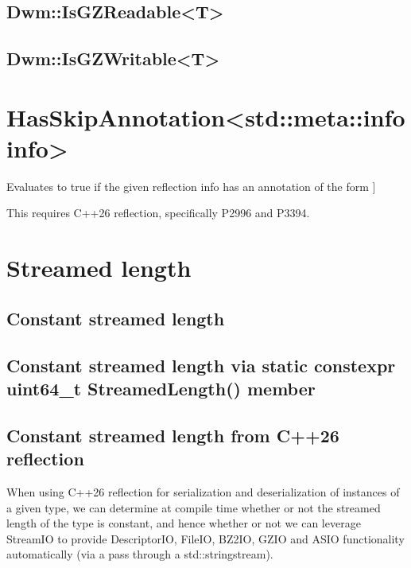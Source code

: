\begin{minipage}{\textwidth}
\subsection{\ttfamily Dwm::IsGZReadable<T>}\label{concept:DwmIsGZReadable}

\subsection{\ttfamily Dwm::IsGZWritable<T>}\label{concept:DwmIsGZWritable}
\end{minipage}

\section{\ttfamily HasSkipAnnotation<std::meta::info info>}
Evaluates to true if the given reflection {\ttfamily info} has an
annotation of the form {\ttfamily [[=Dwm::skip\_io]]}

This requires C++26 reflection, specifically P2996 and P3394.

\section{Streamed length}

\subsection{Constant streamed length}
\subsection{Constant streamed length via {\ttfamily static constexpr
    uint64\_t StreamedLength()} member}
\subsection{Constant streamed length from C++26 reflection}
When using C++26 reflection for serialization and deserialization of
instances of a given type, we can determine at compile time whether
or not the streamed length of the type is constant, and hence whether
or not we can leverage {\ttfamily StreamIO} to provide
{\ttfamily DescriptorIO}, {\ttfamily FileIO}, {\ttfamily BZ2IO},
{\ttfamily GZIO} and {\ttfamily ASIO} functionality automatically
(via a pass through a {\ttfamily std::stringstream}).
